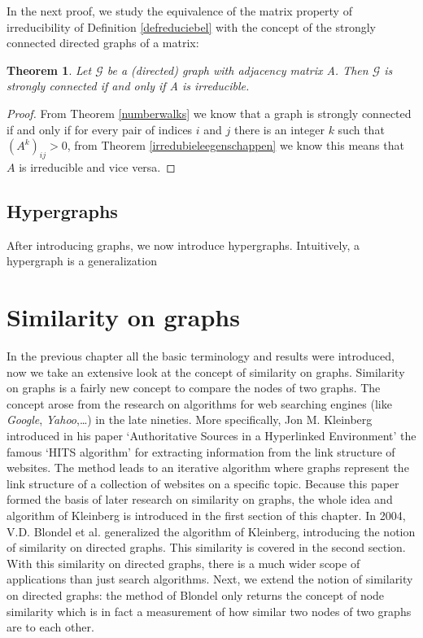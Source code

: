 \documentclass[a4paper,11pt]{report}
\newtheorem{theorem}{Theorem}[section]
\newcommand{\graf}{\mathscr{G}}
\begin{document}
In the next proof, we study the equivalence of the matrix property of 
irreducibility of  Definition \ref{defreduciebel} with the concept of the 
strongly connected directed graphs of a matrix:
\begin{theorem}
    Let $\graf$ be a (directed) graph with adjacency matrix A. Then $\graf$ is strongly connected if and only if A is irreducible.

\end{theorem}

\begin{proof}
From Theorem \ref{numberwalks} we know that a graph is strongly connected if and only if for every pair of indices $i$ and $j$ 
there is an integer $k$ such that $(A^k)_{ij} > 0$, from Theorem \ref{irredubieleegenschappen} we 
know this means that $A$ is irreducible and vice versa.

\end{proof}

\section{Hypergraphs}
After introducing graphs, we now introduce hypergraphs. Intuitively, a 
hypergraph is a generalization 


\chapter{Similarity on graphs}

In the previous chapter all the basic terminology and results were introduced, 
now we take an extensive look at the concept of similarity on graphs. Similarity on graphs is a fairly new
concept to compare the nodes of two graphs. The concept arose from the research on algorithms for web searching engines (like \emph{Google}, \emph{Yahoo},\ldots) in the late nineties. 
More specifically, Jon M. Kleinberg 
introduced in his paper `Authoritative Sources in a Hyperlinked Environment' 
\cite{kleinberg} the famous `HITS algorithm' for extracting information from the link structure of websites. The method leads to an iterative algorithm where 
graphs represent the link structure of a collection of websites on a specific topic. Because this paper formed the basis of later research on similarity on graphs, 
the
whole idea and algorithm of Kleinberg is introduced in the first section of this chapter. In 
2004, V.D. Blondel et al. \cite{blondel} generalized the algorithm of 
Kleinberg, introducing the notion of similarity on directed graphs. This similarity is covered in the second section. With this similarity on directed graphs, 
there is a much wider scope of applications than just search algorithms. Next, we extend the notion of similarity on directed graphs: the method
of Blondel only returns the concept of node similarity which is in fact a 
measurement of how similar two nodes of two graphs are to each other.
\end{document}

